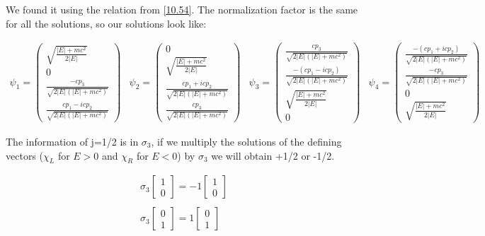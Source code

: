 We found it using the relation from \ref{10.54}. The normalization factor is the same for all the solutions, so our solutions look like:

\begin{equation}
  \begin{array}{cccc}
    \psi_1 = \begin{pmatrix}
      \sqrt{\frac{|E|+mc^2}{2|E|}}\\
      0\\
      \frac{-cp_3}{\sqrt{2|E|(|E|+mc^2)}}\\
      \frac{cp_1-icp_2}{\sqrt{2|E|(|E|+mc^2)}}
    \end{pmatrix}&
    \psi_2 = \begin{pmatrix}
      0\\
      \sqrt{\frac{|E|+mc^2}{2|E|}}\\
      \frac{cp_1+icp_2}{\sqrt{2|E|(|E|+mc^2)}}\\
      \frac{cp_3}{\sqrt{2|E|(|E|+mc^2)}}
    \end{pmatrix}&
    \psi_3 = \begin{pmatrix}
      \frac{cp_3}{\sqrt{2|E|(|E|+mc^2)}}\\
      \frac{-(cp_1-icp_2)}{\sqrt{2|E|(|E|+mc^2)}}\\
      \sqrt{\frac{|E|+mc^2}{2|E|}}\\
      0
    \end{pmatrix}&
    \psi_4 = \begin{pmatrix}
      \frac{-(cp_1+icp_2)}{\sqrt{2|E|(|E|+mc^2)}}\\
      \frac{-cp_3}{\sqrt{2|E|(|E|+mc^2)}}\\
      0\\
      \sqrt{\frac{|E|+mc^2}{2|E|}}
    \end{pmatrix}
  \end{array}
\end{equation}

The information of j=1/2 is in $\sigma_3$, if we multiply the solutions of the defining vectors ($\chi_L$ for $E>0$ and $\chi_R$ for $E<0$) by $\sigma_3$ we will obtain +1/2 or -1/2.


\begin{equation}
  \begin{array}{c}
  \sigma_3 \begin{bmatrix}
    1\\
    0
  \end{bmatrix} = -1 \begin{bmatrix}
    1\\
    0
  \end{bmatrix}
  \\

  \\
  \sigma_3 \begin{bmatrix}
    0\\
    1
  \end{bmatrix} = 1 \begin{bmatrix}
    0\\
    1
  \end{bmatrix}
  \end{array}
\end{equation}

